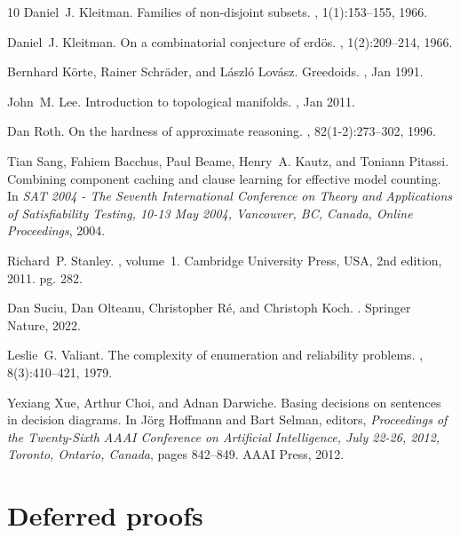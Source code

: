 \documentclass[11pt,a4paper]{article}
\theoremstyle{definition}
\begin{document}
\begin{thebibliography}{10}
Daniel~J. Kleitman.
\newblock Families of non-disjoint subsets.
, 1(1):153--155, 1966.

Daniel~J. Kleitman.
\newblock On a combinatorial conjecture of erdös.
, 1(2):209--214, 1966.

Bernhard Körte, Rainer Schräder, and László Lovász.
\newblock Greedoids.
, Jan 1991.

John~M. Lee.
\newblock Introduction to topological manifolds.
, Jan 2011.

Dan Roth.
\newblock On the hardness of approximate reasoning.
, 82(1-2):273--302, 1996.

Tian Sang, Fahiem Bacchus, Paul Beame, Henry~A. Kautz, and Toniann Pitassi.
\newblock Combining component caching and clause learning for effective model
  counting.
\newblock In {\em {SAT} 2004 - The Seventh International Conference on Theory
  and Applications of Satisfiability Testing, 10-13 May 2004, Vancouver, BC,
  Canada, Online Proceedings}, 2004.

Richard~P. Stanley.
, volume~1.
\newblock Cambridge University Press, USA, 2nd edition, 2011.
\newblock pg. 282.

Dan Suciu, Dan Olteanu, Christopher R{\'e}, and Christoph Koch.
.
\newblock Springer Nature, 2022.

Leslie~G. Valiant.
\newblock The complexity of enumeration and reliability problems.
, 8(3):410--421, 1979.

Yexiang Xue, Arthur Choi, and Adnan Darwiche.
\newblock Basing decisions on sentences in decision diagrams.
\newblock In J{\"{o}}rg Hoffmann and Bart Selman, editors, {\em Proceedings of
  the Twenty-Sixth {AAAI} Conference on Artificial Intelligence, July 22-26,
  2012, Toronto, Ontario, Canada}, pages 842--849. {AAAI} Press, 2012.

\end{thebibliography}

%
%
%

\appendix
%
\appendix
\section{Deferred proofs}
\end{document}
